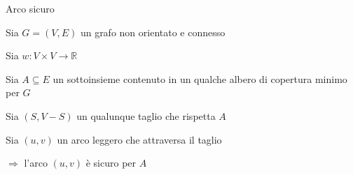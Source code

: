 \begin{frame}{Arco sicuro}

\vspace{-9pt}
\begin{myboxtitle}[Teorema]
\BIL
\item Sia $G=(V,E)$ un grafo non orientato e connesso 
\item Sia $w: V \times V \rightarrow \mathbb{R}$
\item Sia $A \subseteq E$ un sottoinsieme contenuto in un qualche albero di copertura minimo per $G$ 
\item Sia $(S,V-S)$ un qualunque taglio che rispetta $A$
\item Sia $(u,v)$ un arco leggero che attraversa il taglio
\EIL

\bigskip
$\Rightarrow$ l'arco $(u,v)$ è sicuro per $A$	
\end{myboxtitle}
\end{frame}


